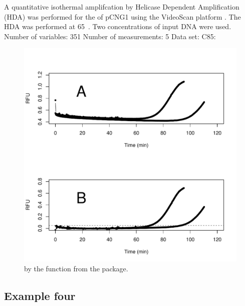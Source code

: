 A quantitative isothermal amplifcation by Helicase Dependent Amplification (HDA) was performed for the of pCNG1 using the VideoScan platform
\citep{rodiger_highly_2013}. The HDA was performed at 65~\textcelsius. Two concentrations of input DNA were used.
Number of variables: 351
Number of measurements: 5
Data set: C85:


\begin{figure}[htbp]
  \centering
  \includegraphics[clip=true, width=16cm]{figures/qIA.pdf}
  \caption{by the  function from the  package.}
  \label{figure:qIA}
\end{figure}


\subsection{Example four}

